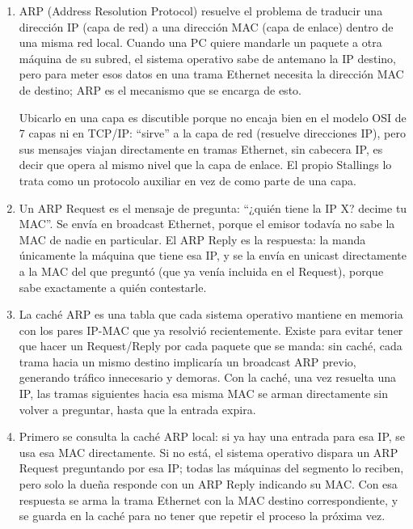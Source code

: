 \documentclass[11pt,a4paper]{article}
\begin{document}
\begin{enumerate}[label=\alph*)]

  \item ARP (Address Resolution Protocol) resuelve el problema de traducir una dirección IP (capa de red) a una dirección MAC (capa de enlace) dentro de una misma red local. Cuando una PC quiere mandarle un paquete a otra máquina de su subred, el sistema operativo sabe de antemano la IP destino, pero para meter esos datos en una trama Ethernet necesita la dirección MAC de destino; ARP es el mecanismo que se encarga de esto.

  Ubicarlo en una capa es discutible porque no encaja bien en el modelo OSI de 7 capas ni en TCP/IP: ``sirve'' a la capa de red (resuelve direcciones IP), pero sus mensajes viajan directamente en tramas Ethernet, sin cabecera IP, es decir que opera al mismo nivel que la capa de enlace. El propio Stallings lo trata como un protocolo auxiliar en vez de como parte de una capa.

  \item Un ARP Request es el mensaje de pregunta: ``¿quién tiene la IP X? decime tu MAC''. Se envía en broadcast Ethernet, porque el emisor todavía no sabe la MAC de nadie en particular. El ARP Reply es la respuesta: la manda únicamente la máquina que tiene esa IP, y se la envía en unicast directamente a la MAC del que preguntó (que ya venía incluida en el Request), porque sabe exactamente a quién contestarle.

  \item La caché ARP es una tabla que cada sistema operativo mantiene en memoria con los pares IP-MAC que ya resolvió recientemente. Existe para evitar tener que hacer un Request/Reply por cada paquete que se manda: sin caché, cada trama hacia un mismo destino implicaría un broadcast ARP previo, generando tráfico innecesario y demoras. Con la caché, una vez resuelta una IP, las tramas siguientes hacia esa misma MAC se arman directamente sin volver a preguntar, hasta que la entrada expira.

  \item Primero se consulta la caché ARP local: si ya hay una entrada para esa IP, se usa esa MAC directamente. Si no está, el sistema operativo dispara un ARP Request preguntando por esa IP; todas las máquinas del segmento lo reciben, pero solo la dueña responde con un ARP Reply indicando su MAC. Con esa respuesta se arma la trama Ethernet con la MAC destino correspondiente, y se guarda en la caché para no tener que repetir el proceso la próxima vez.


\end{enumerate}
\end{document}
